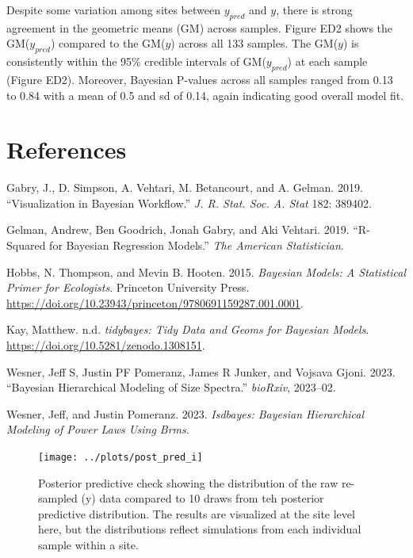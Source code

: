 \documentclass[
  12pt,
]{article}
\newlength{\cslhangindent}
\newlength{\cslentryspacingunit} %
\newenvironment{CSLReferences}[2] %
 {%
  \setlength{\parindent}{0pt}
  \ifodd #1
  \let\oldpar\par
  \def\par{\hangindent=\cslhangindent\oldpar}
  \fi
  \setlength{\parskip}{#2\cslentryspacingunit}
 }%
 {}
\begin{document}
Despite some variation among sites between \(y_{pred}\) and \(y\), there
is strong agreement in the geometric means (GM) across samples. Figure
ED2 shows the GM(\(y_{pred}\)) compared to the GM(\(y\)) across all 133
samples. The GM(\(y\)) is consistently within the 95\% credible
intervals of GM(\(y_{pred}\)) at each sample (Figure ED2). Moreover,
Bayesian P-values across all samples ranged from 0.13 to 0.84 with a
mean of 0.5 and sd of 0.14, again indicating good overall model fit.

\hypertarget{references}{%
\section{References}\label{references}}

\hypertarget{refs}{}
\begin{CSLReferences}{1}{0}
\leavevmode{}%
Gabry, J., D. Simpson, A. Vehtari, M. Betancourt, and A. Gelman. 2019.
{``Visualization in Bayesian Workflow.''} \emph{J. R. Stat. Soc. A.
Stat} 182: 389402.

\leavevmode{}%
Gelman, Andrew, Ben Goodrich, Jonah Gabry, and Aki Vehtari. 2019.
{``R-Squared for Bayesian Regression Models.''} \emph{The American
Statistician}.

\leavevmode{}%
Hobbs, N. Thompson, and Mevin B. Hooten. 2015. \emph{Bayesian Models:
{A} Statistical Primer for Ecologists}. {Princeton University Press}.
\url{https://doi.org/10.23943/princeton/9780691159287.001.0001}.

\leavevmode{}%
Kay, Matthew. n.d. \emph{{tidybayes}: Tidy Data and Geoms for {Bayesian}
Models}. \url{https://doi.org/10.5281/zenodo.1308151}.

\leavevmode{}%
Wesner, Jeff S, Justin PF Pomeranz, James R Junker, and Vojsava Gjoni.
2023. {``Bayesian Hierarchical Modeling of Size Spectra.''}
\emph{bioRxiv}, 2023--02.

\leavevmode{}%
Wesner, Jeff, and Justin Pomeranz. 2023. \emph{Isdbayes: Bayesian
Hierarchical Modeling of Power Laws Using Brms}.

\end{CSLReferences}

\newpage

\begin{figure}
\texttt{[image: ../plots/post\_pred\_i]} \caption{Posterior predictive check showing the distribution of the raw re-sampled (y) data compared to 10 draws from teh posterior predictive distribution. The results are visualized at the site level here, but the distributions reflect simulations from each individual sample within a site.}\label{fig:unnamed-chunk-1}
\end{figure}
\end{document}
